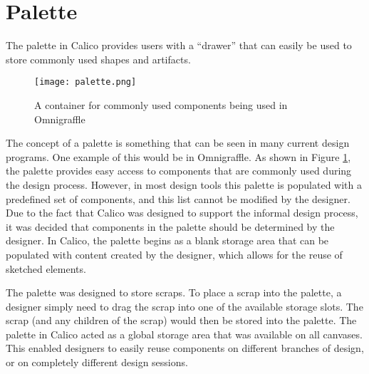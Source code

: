 \section{Palette}
The palette in Calico provides users with a ``drawer'' that can easily be used to store commonly used shapes and artifacts.
\begin{figure}[htb]
  \centering
  \texttt{[image: palette.png]}
  \caption{A container for commonly used components being used in Omnigraffle}
  \label{fig:palette_omnigraffle}
\end{figure}
The concept of a palette is something that can be seen in many current design programs. One example of this would be in Omnigraffle\cite{todo}. As shown in Figure \ref{fig:palette_omnigraffle}, the palette provides easy access to components that are commonly used during the design process. However, in most design tools this palette is populated with a predefined set of components, and this list cannot be modified by the designer. Due to the fact that Calico was designed to support the informal design process, it was decided that components in the palette should be determined by the designer. In Calico, the palette begins as a blank storage area that can be populated with content created by the designer, which allows for the reuse of sketched elements. 

The palette was designed to store scraps. To place a scrap into the palette, a designer simply need to drag the scrap into one of the available storage slots. The scrap (and any children of the scrap) would then be stored into the palette. The palette in Calico acted as a global storage area that was available on all canvases. This enabled designers to easily reuse components on different branches of design, or on completely different design sessions.  




